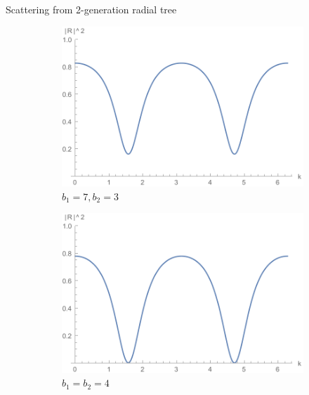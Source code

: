 \documentclass{beamer}
\begin{document}
  \begin{frame}{Scattering from 2-generation radial tree}
    \begin{figure}[h]
      \begin{subfigure}[t]{0.35\textwidth}
        \includegraphics[width=1\textwidth]{../latex/img/2gen_reflection_l=1_b1=3_b2=7}
        \caption{$b_1=7, b_2=3$}
      \end{subfigure}
      \begin{subfigure}[t]{0.35\textwidth}
        \includegraphics[width=1\textwidth]{../latex/img/2gen_reflection_l=1_b1=b2=4}
        \caption{$b_1=b_2=4$}
      \end{subfigure}
      \\
      \begin{subfigure}[t]{0.35\textwidth}

\end{subfigure}
\end{figure}
\end{frame}
\end{document}

